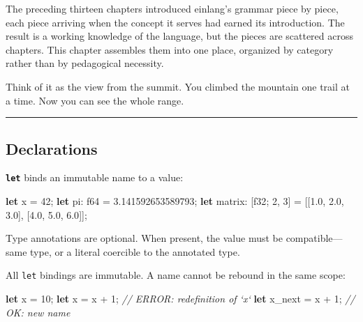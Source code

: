 \documentclass[11pt,]{article}
\newenvironment{Shaded}{}{}
\newcommand{\CommentTok}[1]{\textcolor[rgb]{0.38,0.63,0.69}{\textit{#1}}}
\newcommand{\DataTypeTok}[1]{\textcolor[rgb]{0.56,0.13,0.00}{#1}}
\newcommand{\DecValTok}[1]{\textcolor[rgb]{0.25,0.63,0.44}{#1}}
\newcommand{\KeywordTok}[1]{\textcolor[rgb]{0.00,0.44,0.13}{\textbf{#1}}}
\newcommand{\NormalTok}[1]{#1}
\newcommand{\OperatorTok}[1]{\textcolor[rgb]{0.40,0.40,0.40}{#1}}
\begin{document}
The preceding thirteen chapters introduced einlang's grammar piece by
piece, each piece arriving when the concept it serves had earned its
introduction. The result is a working knowledge of the language, but the
pieces are scattered across chapters. This chapter assembles them into
one place, organized by category rather than by pedagogical necessity.

Think of it as the view from the summit. You climbed the mountain one
trail at a time. Now you can see the whole range.

\begin{center}\rule{0.5\linewidth}{0.4pt}\end{center}

\hypertarget{declarations}{%
\subsection{Declarations}\label{declarations}}

\textbf{\texttt{let}} binds an immutable name to a value:

\begin{Shaded}
\begin{Highlighting}[]
\KeywordTok{let}\NormalTok{ x = }\DecValTok{42}\NormalTok{;}
\KeywordTok{let}\NormalTok{ pi: }\DataTypeTok{f64}\NormalTok{ = }\DecValTok{3.141592653589793}\NormalTok{;}
\KeywordTok{let}\NormalTok{ matrix: }\OperatorTok{[}\DataTypeTok{f32}\NormalTok{; }\DecValTok{2}\NormalTok{, }\DecValTok{3}\OperatorTok{]}\NormalTok{ = }\OperatorTok{[[}\DecValTok{1.0}\NormalTok{, }\DecValTok{2.0}\NormalTok{, }\DecValTok{3.0}\OperatorTok{]}\NormalTok{, }\OperatorTok{[}\DecValTok{4.0}\NormalTok{, }\DecValTok{5.0}\NormalTok{, }\DecValTok{6.0}\OperatorTok{]]}\NormalTok{;}
\end{Highlighting}
\end{Shaded}

Type annotations are optional. When present, the value must be
compatible---same type, or a literal coercible to the annotated type.

All \texttt{let} bindings are immutable. A name cannot be rebound in the
same scope:

\begin{Shaded}
\begin{Highlighting}[]
\KeywordTok{let}\NormalTok{ x = }\DecValTok{10}\NormalTok{;}
\KeywordTok{let}\NormalTok{ x = x + }\DecValTok{1}\NormalTok{;       }\CommentTok{// ERROR: redefinition of `x`}
\KeywordTok{let}\NormalTok{ x_next = x + }\DecValTok{1}\NormalTok{;  }\CommentTok{// OK: new name}
\end{Highlighting}
\end{Shaded}
\end{document}
